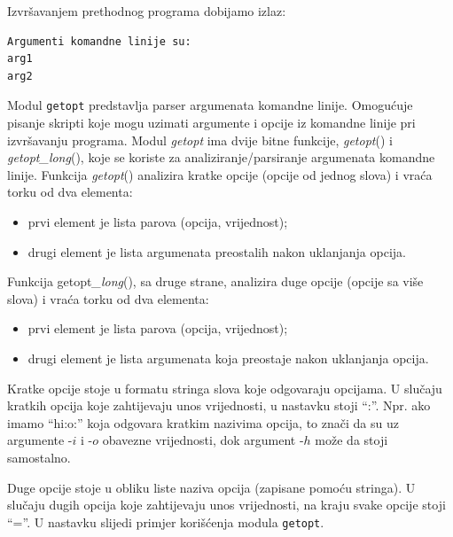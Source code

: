 Izvršavanjem prethodnog programa dobijamo izlaz:
\begin{verbatim}
Argumenti komandne linije su:
arg1
arg2
\end{verbatim}

Modul \texttt{getopt} predstavlja parser argumenata komandne linije. Omo\-gućuje  pisanje skripti koje mogu uzimati argumente i opcije iz komandne linije pri izvršavanju programa. Modul \textit{getopt} ima dvije bitne funkcije, \textit{getopt}() i \textit{getopt\_long}(), koje se koriste za analiziranje/parsiranje argu\-menata komandne linije. Funkcija \textit{getopt}() analizira kratke opcije (opcije od jednog slova) i vraća torku od dva elementa:

\begin{itemize}
	\item prvi element je lista parova (opcija, vrijednost); 
	\item drugi element je lista argumenata preostalih nakon uklanjanja opcija.
\end{itemize} 
 
Funkcija getopt\textit{\_long}(), sa druge strane, analizira duge opcije (opcije sa više slova) i vraća torku od dva elementa: 
\begin{itemize}
	\item  prvi element je lista parova (opcija, vrijednost);
	\item  drugi element je lista argumenata koja preostaje nakon uklanjanja opcija.
\end{itemize}

Kratke opcije stoje u formatu stringa slova koje odgovaraju opci\-jama. 
U slučaju kratkih opcija koje zahtijevaju unos vrijednosti, u nastavku stoji ``:''. 
Npr. ako imamo ``hi:o:'' koja odgovara kratkim nazivima opcija, to znači da su uz argumente -$i$ i -$o$ obavezne vrijednosti, dok argument -$h$ može da stoji samostalno. 
  
Duge opcije stoje u obliku liste naziva opcija (zapisane pomoću stringa). 
U slučaju dugih opcija koje zahtijevaju unos vrijednosti, na kraju svake opcije stoji ``=''.  U nastavku slijedi primjer korišćenja modula \texttt{getopt}.

